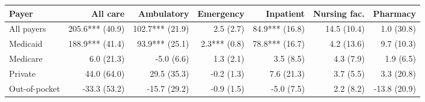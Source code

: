 \begin{tabular}{@{}l rrrrrr@{}}
\toprule
Payer & All care & Ambulatory & Emergency & Inpatient & Nursing fac. & Pharmacy \\
\midrule
All payers & 205.6*** (40.9) & 102.7*** (21.9) & 2.5 (2.7) & 84.9*** (16.8) & 14.5 (10.4) & 1.0 (30.8) \\
Medicaid & 188.9*** (41.4) & 93.9*** (25.1) & 2.3*** (0.8) & 78.8*** (16.7) & 4.2 (13.6) & 9.7 (10.3) \\
Medicare & 6.0 (21.3) & -5.0 (6.6) & 1.3 (2.1) & 3.5 (8.5) & 4.3 (7.9) & 1.9 (6.5) \\
Private & 44.0 (64.0) & 29.5 (35.3) & -0.2 (1.3) & 7.6 (21.3) & 3.7 (5.5) & 3.3 (20.8) \\
Out-of-pocket & -33.3 (53.2) & -15.7 (29.2) & -0.9 (1.5) & -5.0 (7.5) & 2.2 (8.2) & -13.8 (20.9) \\
\bottomrule
\end{tabular}
